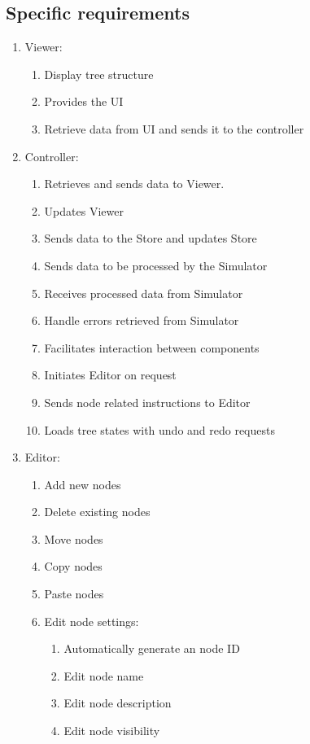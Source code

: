 \documentclass{article}
\begin{document}
  \subsection{Specific requirements}
  \begin{enumerate}
  \item Viewer:
    \begin{enumerate}
      \item Display tree structure
      \item Provides the UI
      \item Retrieve data from UI and sends it to the controller
    \end{enumerate}
    \item Controller:
    \begin{enumerate}
      \item Retrieves and sends data to Viewer.
      \item Updates Viewer
      \item Sends data to the Store and updates Store
      \item Sends data to be processed by the Simulator
      \item Receives processed data from Simulator
      \item Handle errors retrieved from Simulator
      \item Facilitates interaction between components
      \item Initiates Editor on request
      \item Sends node related instructions to Editor
      \item Loads tree states with undo and redo requests
    \end{enumerate}
    \item Editor:
    \begin{enumerate}
      \item Add new nodes
      \item Delete existing nodes
      \item Move nodes
      \item Copy nodes
      \item Paste nodes
      \item Edit node settings:
      \begin{enumerate}
        \item Automatically generate an node ID
        \item Edit node name
        \item Edit node description
        \item Edit node visibility

\end{enumerate}
\end{enumerate}
\end{enumerate}
\end{document}
